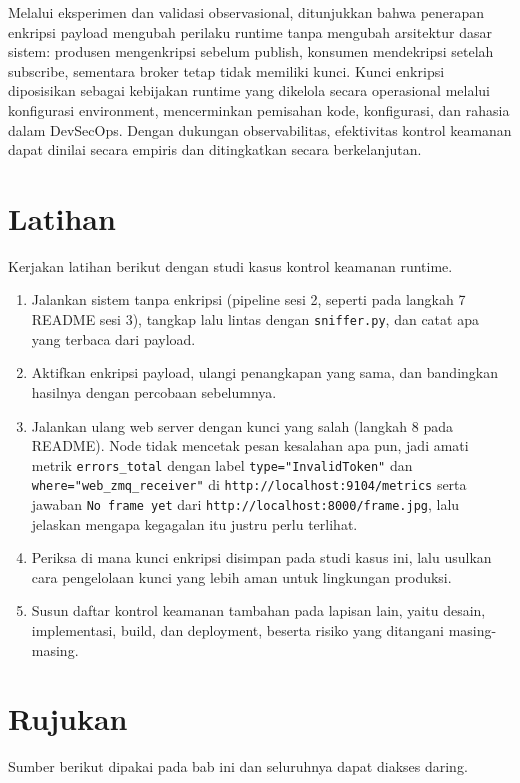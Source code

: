 Melalui eksperimen dan validasi observasional, ditunjukkan bahwa penerapan enkripsi payload mengubah perilaku runtime tanpa mengubah arsitektur dasar sistem: produsen mengenkripsi sebelum publish, konsumen mendekripsi setelah subscribe, sementara broker tetap tidak memiliki kunci. Kunci enkripsi diposisikan sebagai kebijakan runtime yang dikelola secara operasional melalui konfigurasi environment, mencerminkan pemisahan kode, konfigurasi, dan rahasia dalam DevSecOps. Dengan dukungan observabilitas, efektivitas kontrol keamanan dapat dinilai secara empiris dan ditingkatkan secara berkelanjutan.

\section{Latihan}

Kerjakan latihan berikut dengan studi kasus kontrol keamanan runtime.

\begin{enumerate}
  \item Jalankan sistem tanpa enkripsi (pipeline sesi 2, seperti pada langkah 7 README sesi 3), tangkap lalu lintas dengan \texttt{sniffer.py}, dan catat apa yang terbaca dari payload.
  \item Aktifkan enkripsi payload, ulangi penangkapan yang sama, dan bandingkan hasilnya dengan percobaan sebelumnya.
  \item Jalankan ulang web server dengan kunci yang salah (langkah 8 pada README). Node tidak mencetak pesan kesalahan apa pun, jadi amati metrik \texttt{errors\_total} dengan label \texttt{type="InvalidToken"} dan \texttt{where="web\_zmq\_receiver"} di \texttt{http://localhost:9104/metrics} serta jawaban \texttt{No frame yet} dari \texttt{http://localhost:8000/frame.jpg}, lalu jelaskan mengapa kegagalan itu justru perlu terlihat.
  \item Periksa di mana kunci enkripsi disimpan pada studi kasus ini, lalu usulkan cara pengelolaan kunci yang lebih aman untuk lingkungan produksi.
  \item Susun daftar kontrol keamanan tambahan pada lapisan lain, yaitu desain, implementasi, build, dan deployment, beserta risiko yang ditangani masing-masing.
\end{enumerate}

\section{Rujukan}

Sumber berikut dipakai pada bab ini dan seluruhnya dapat diakses daring.

